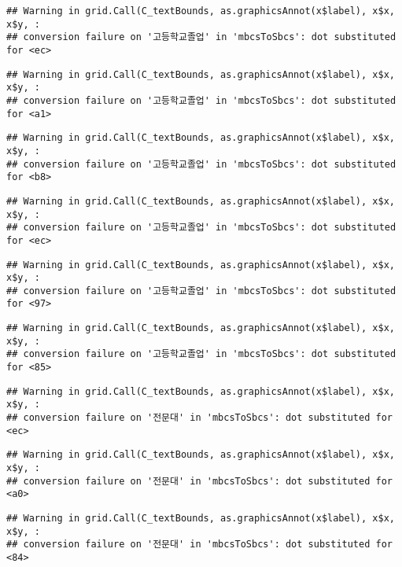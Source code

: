 \documentclass[
]{article}
\begin{document}
\begin{verbatim}
## Warning in grid.Call(C_textBounds, as.graphicsAnnot(x$label), x$x, x$y, :
## conversion failure on '고등학교졸업' in 'mbcsToSbcs': dot substituted for <ec>
\end{verbatim}

\begin{verbatim}
## Warning in grid.Call(C_textBounds, as.graphicsAnnot(x$label), x$x, x$y, :
## conversion failure on '고등학교졸업' in 'mbcsToSbcs': dot substituted for <a1>
\end{verbatim}

\begin{verbatim}
## Warning in grid.Call(C_textBounds, as.graphicsAnnot(x$label), x$x, x$y, :
## conversion failure on '고등학교졸업' in 'mbcsToSbcs': dot substituted for <b8>
\end{verbatim}

\begin{verbatim}
## Warning in grid.Call(C_textBounds, as.graphicsAnnot(x$label), x$x, x$y, :
## conversion failure on '고등학교졸업' in 'mbcsToSbcs': dot substituted for <ec>
\end{verbatim}

\begin{verbatim}
## Warning in grid.Call(C_textBounds, as.graphicsAnnot(x$label), x$x, x$y, :
## conversion failure on '고등학교졸업' in 'mbcsToSbcs': dot substituted for <97>
\end{verbatim}

\begin{verbatim}
## Warning in grid.Call(C_textBounds, as.graphicsAnnot(x$label), x$x, x$y, :
## conversion failure on '고등학교졸업' in 'mbcsToSbcs': dot substituted for <85>
\end{verbatim}

\begin{verbatim}
## Warning in grid.Call(C_textBounds, as.graphicsAnnot(x$label), x$x, x$y, :
## conversion failure on '전문대' in 'mbcsToSbcs': dot substituted for <ec>
\end{verbatim}

\begin{verbatim}
## Warning in grid.Call(C_textBounds, as.graphicsAnnot(x$label), x$x, x$y, :
## conversion failure on '전문대' in 'mbcsToSbcs': dot substituted for <a0>
\end{verbatim}

\begin{verbatim}
## Warning in grid.Call(C_textBounds, as.graphicsAnnot(x$label), x$x, x$y, :
## conversion failure on '전문대' in 'mbcsToSbcs': dot substituted for <84>
\end{verbatim}
\end{document}
